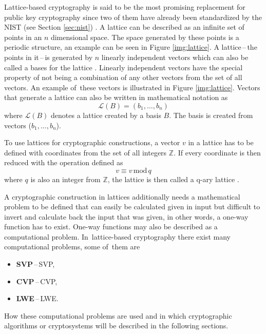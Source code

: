 Lattice-based cryptography is said to be the most promising replacement for public key cryptography since two of them have already been standardized by the NIST (see Section \ref{sec:nist}) \cite{Alagic2022}. A lattice can be described as an infinite set of points in an $n$ dimensional space. The space generated by these points is a periodic structure, an example can be seen in Figure \ref{img:lattice}. A lattice\,--\,the points in it\,--\,is generated by $n$ linearly independent vectors which can also be called a bases for the lattice \cite{Ajati1996}. Linearly independent vectors have the special property of not being a combination of any other vectors from the set of all vectors. An example of~these vectors is illustrated in Figure \ref{img:lattice}. Vectors that generate a lattice can also be written in mathematical notation as
\begin{equation}
  \mathcal{L}(B)=(b_1,\dots,b_n)
\end{equation}
where $\mathcal{L}(B)$ denotes a lattice created by a basis $B$. The basis is created from vectors ($b_1,\dots,b_n$).


To use lattices for cryptographic constructions, a vector $v$ in a lattice has to be defined with coordinates from the set of all integers $\mathbb{Z}$. If every coordinate is then reduced with the operation defined as
\begin{equation}
  v\equiv v\,\mathrm{mod}\,q
\end{equation}
where $q$ is also an integer from $\mathbb{Z}$, the lattice is then called a q-ary lattice \cite{Bernstein2009}.

A cryptographic construction in lattices additionally needs a mathematical problem to be defined that can easily be calculated given in input but difficult to invert and calculate back the input that was given, in other words, a one-way function has to exist. One-way functions may also be described as a computational problem. In~lattice-based cryptography there exist many computational problems, some of~them are \cite{Bernstein2009}
\begin{itemize}
  \item \textbf{SVP}\,--\,\acl{SVP},
  \item \textbf{CVP}\,--\,\acl{CVP},
  \item \textbf{LWE}\,--\,\acl{LWE}.
\end{itemize}
How these computational problems are used and in which cryptographic algorithms or cryptosystems will be described in the following sections.
